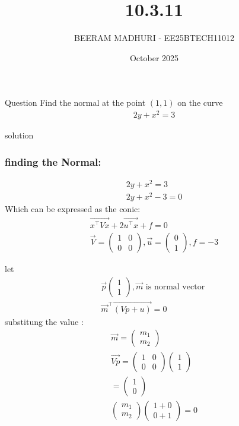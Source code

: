 \documentclass{beamer}
\title %
{10.3.11}
\date{October  2025}
\author %
{BEERAM MADHURI - EE25BTECH11012}
\begin{document}
\frame{\titlepage}
\begin{frame}{Question}
Find the normal at the point $(1,1)$ on the curve
\begin{align}
2y + x^2 = 3
\end{align}
\end{frame}

\begin{frame}{solution}
    \frametitle{finding the Normal:}
\begin{align}
    2y + x^2 = 3\\
    2y + x^2 -3 = 0
\end{align}
Which can be expressed as the conic:
\begin{align}
\vec{x^\top V x} + 2\vec{u^\top x} + f = 0\\
\vec{V} = \begin{pmatrix}1 & 0 \\0 & 0\end{pmatrix}, \vec{u} = \begin{pmatrix}0 \\1\end{pmatrix}, f = -3
\end{align}
\end{frame}
\begin{frame}
let 
\begin{align}
\vec{p} \begin{pmatrix} 1 \\ 1 \end{pmatrix} , \vec{m} \text{ is normal vector }\\
\vec{m}^\top \vec{(Vp + u)} = 0
\end{align}
substitung the value :
\begin{align}
\vec{m}=\begin{pmatrix} m_1 \\ m_2 \end{pmatrix} \\
\vec{Vp}=\begin{pmatrix}1 & 0 \\0 & 0\end{pmatrix}\begin{pmatrix}
    1\\1 \end{pmatrix}\\
    =\begin{pmatrix} 1\\0 \end{pmatrix}\\
\begin{pmatrix} m_1 \\ m_2 \end{pmatrix} \begin{pmatrix} 1+0\\0+1 \end{pmatrix}=0
\end{align}
\end{frame}
\end{document}
